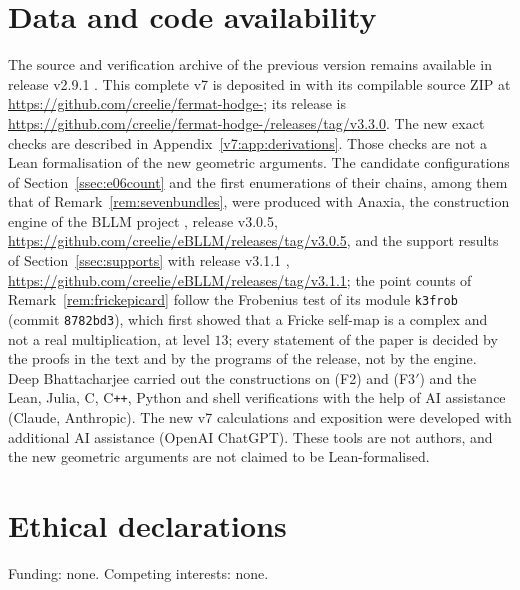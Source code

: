 \documentclass[11pt,reqno]{amsart}
\numberwithin{equation}{section}
\theoremstyle{plain}
\theoremstyle{definition}
\newcommand{\Fii}{\texorpdfstring{\textup{(F2)}}{(F2)}}
\newcommand{\Fiii}{\texorpdfstring{\textup{(F3$'$)}}{(F3')}}
\newcommand{\codeRelease}{https://github.com/creelie/fermat-hodge-/releases/tag/v3.3.0}
\begin{document}
\section*{Data and code availability}
The source and verification archive of the previous version remains available in release v2.9.1 \cite{BB26code}. This complete v7 is deposited in  with its compilable source ZIP  at \url{https://github.com/creelie/fermat-hodge-}; its release is \url{\codeRelease}. The new exact checks are described in Appendix~\ref{v7:app:derivations}. Those checks are not a Lean formalisation of the new geometric arguments. The candidate configurations of Section~\ref{ssec:e06count} and the first enumerations of their chains, among them that of Remark~\ref{rem:sevenbundles}, were produced with Anaxia, the construction engine of the BLLM project \cite{Bha26bllm}, release v3.0.5, \url{https://github.com/creelie/eBLLM/releases/tag/v3.0.5}, and the support results of Section~\ref{ssec:supports} with release v3.1.1 \cite{Bha26bllmb}, \url{https://github.com/creelie/eBLLM/releases/tag/v3.1.1}; the point counts of Remark~\ref{rem:frickepicard} follow the Frobenius test of its module \texttt{k3frob} (commit \texttt{8782bd3}), which first showed that a Fricke self-map is a complex and not a real multiplication, at level $13$; every statement of the paper is decided by the proofs in the text and by the programs of the release, not by the engine. Deep Bhattacharjee carried out the constructions on \Fii{} and \Fiii{} and the Lean, Julia, C, C\texttt{++}, Python and shell verifications with the help of AI assistance (Claude, Anthropic). The new v7 calculations and exposition were developed with additional AI assistance (OpenAI ChatGPT). These tools are not authors, and the new geometric arguments are not claimed to be Lean-formalised.

\section*{Ethical declarations}
Funding: none. Competing interests: none.
\end{document}
